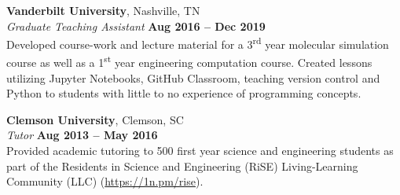 \textbf{Vanderbilt University}, Nashville, TN \vspace{2mm}\\\vspace{1mm}%
\textsl{Graduate Teaching Assistant} \hfill \textbf{Aug 2016 -- Dec 2019}\\
Developed course-work and lecture material for a 3\textsuperscript{rd} year molecular simulation course as well as a 1\textsuperscript{st} year engineering computation course.
Created lessons utilizing Jupyter Notebooks, GitHub Classroom, teaching version control and Python to students with little to no experience of programming concepts.

\textbf{Clemson University}, Clemson, SC \vspace{2mm}\\\vspace{1mm}%
\textsl{Tutor} \hfill \textbf{Aug 2013 -- May 2016}\\
Provided academic tutoring to 500 first year science and engineering students as part of the Residents in Science and Engineering (RiSE) Living-Learning Community (LLC) (\url{https://1n.pm/rise}).
